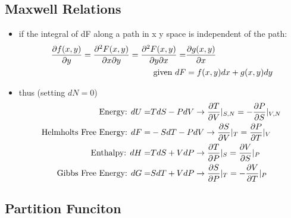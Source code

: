 \subsection*{Maxwell Relations}
\begin{itemize}
    \item if the integral of dF along a path in x y space is independent of the path: 
    \begin{align*}
        \pdv{f(x,y)}{y} = \pdv{F(x,y)}{x}{y} = \pdv{F(x,y)}{y}{x} = &\pdv{g(x,y)}{x} \\
        \text{given } dF &= f(x,y)dx + g(x,y)dy
    \end{align*}
    \item thus (setting $dN = 0$)
    \begin{align*}
        \text{Energy: } dU =& T dS - PdV \rightarrow \pdv{T}{V}|_{S,N} = - \pdv{P}{S}|_{V,N} \\
        \text{Helmholts Free Energy: } dF =& -S dT - P dV \rightarrow \pdv{S}{V}|_T = \pdv{P}{T}|_V \\
        \text{Enthalpy: } dH =& T dS + V dP \rightarrow \pdv{T}{P}|_S = \pdv{V}{S}|_P \\
        \text{Gibbs Free Energy: } dG =& S dT + V dP  \rightarrow \pdv{S}{P}|_T = - \pdv{V}{T}|_P 
    \end{align*}

\end{itemize}

\subsection*{Partition Funciton}